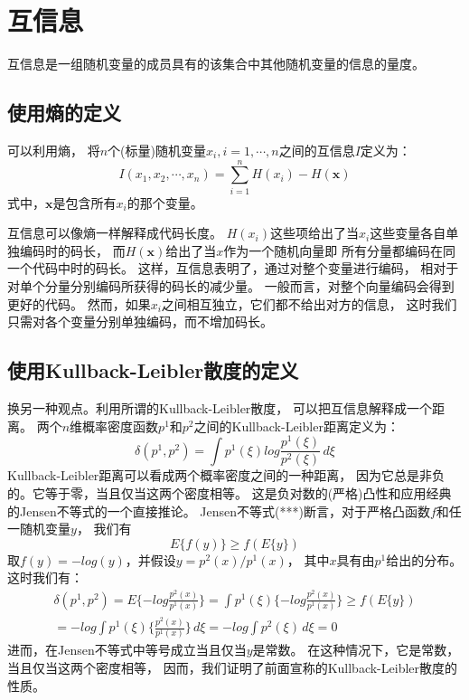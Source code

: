 \section{互信息}
互信息是一组随机变量的成员具有的该集合中其他随机变量的信息的量度。

\subsection{使用熵的定义}
可以利用熵，
将$n$个(标量)随机变量$x_i, i=1,\cdots,n$之间的互信息$I$定义为：
\begin{equation} \label{mutual_info_defination1}
I(x_1, x_2,\cdots ,x_n)=\sum^n_{i=1} H(x_i)-H(\bm{x})
\end{equation}
式中，$\bm{x}$是包含所有$x_i$的那个变量。

互信息可以像熵一样解释成代码长度。
$H(x_i)$这些项给出了当$x_i$这些变量各自单独编码时的码长，
而$H(\bm{x})$给出了当$x$作为一个随机向量即
所有分量都编码在同一个代码中时的码长。
这样，互信息表明了，通过对整个变量进行编码，
相对于对单个分量分别编码所获得的码长的减少量。
一般而言，对整个向量编码会得到更好的代码。
然而，如果$x_i$之间相互独立，它们都不给出对方的信息，
这时我们只需对各个变量分别单独编码，而不增加码长。

\subsection{使用Kullback-Leibler散度的定义}
换另一种观点。利用所谓的Kullback-Leibler散度，
可以把互信息解释成一个距离。
两个$n$维概率密度函数$p^1$和$p^2$之间的Kullback-Leibler距离定义为：
\begin{equation}
\delta(p^1, p^2) = \int p^1(\xi) log \frac{p^1(\xi)}{p^2(\xi)}\,d\xi
\end{equation}
Kullback-Leibler距离可以看成两个概率密度之间的一种距离，
因为它总是非负的。它等于零，当且仅当这两个密度相等。
这是负对数的(严格)凸性和应用经典的Jensen不等式的一个直接推论。
Jensen不等式(***)断言，对于严格凸函数$f$和任一随机变量$y$，
我们有
\begin{equation}
E\{f(y)\} \ge f(E\{y\})
\end{equation}
取$f(y)=-log(y)$，并假设$y=p^2(x)/p^1(x)$，
其中$x$具有由$p^1$给出的分布。这时我们有：
\begin{multline}
\delta(p^1, p^2) = E\{-log \frac{p^2(x)}{p^1(x)} \} 
	= \int p^1(\xi)\{-log \frac{p^2(x)}{p^1(x)} \} 
    \ge f(E\{y\}) \\ 
    = -log \int p^1(\xi)\{ \frac{p^2(x)}{p^1(x)}\}\,d\xi
    = -log \int p^2(\xi)\,d\xi = 0
\end{multline}
进而，在Jensen不等式中等号成立当且仅当$y$是常数。
在这种情况下，它是常数，当且仅当这两个密度相等，
因而，我们证明了前面宣称的Kullback-Leibler散度的性质。

